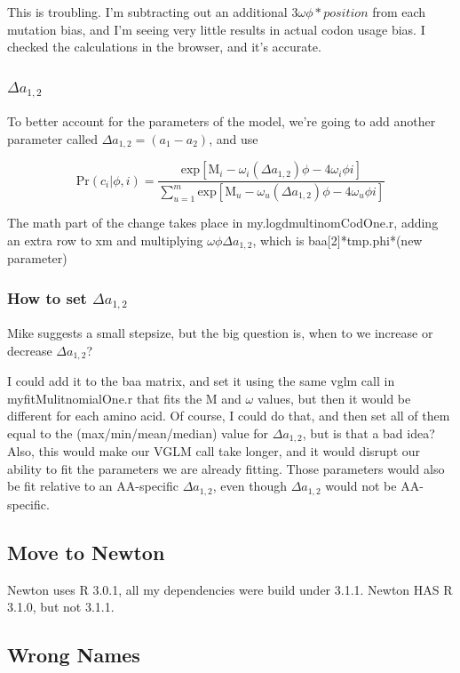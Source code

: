 This is troubling. I'm subtracting out an additional $3\omega\phi * position$ from each mutation bias, and I'm seeing very little results in actual codon usage bias. I checked the calculations in the browser, and it's accurate. 

\subsubsection{$\Delta a_{1,2}$}

To better account for the parameters of the model, we're going to add another parameter called $\Delta a_{1,2} = (a_1 - a_2)$, and use

\[
\mbox{Pr}(c_i|\phi,i)
=
\frac{
\mbox{exp}[\mbox{M}_i
- \omega_i(\Delta a_{1,2})\phi
- 4\omega_i\phi i
]
}{
\sum_{u=1}^m
\mbox{exp}[\mbox{M}_u
- \omega_u(\Delta a_{1,2})\phi
- 4\omega_u\phi i
]
}
\]

The math part of the change takes place in my.logdmultinomCodOne.r, adding an extra row to xm and multiplying $\omega\phi\Delta a_{1,2}$, which is baa[2]*tmp.phi*(new parameter)

\subsubsection{How to set $\Delta a_{1,2}$}

Mike suggests a small stepsize, but the big question is, when to we increase or decrease $\Delta a_{1,2}$?

I could add it to the baa matrix, and set it using the same vglm call in myfitMulitnomialOne.r that fits the M and $\omega$ values, but then it would be different for each amino acid. Of course, I could do that, and then set all of them equal to the (max/min/mean/median) value for $\Delta a_{1,2}$, but is that a bad idea? Also, this would make our VGLM call take longer, and it would disrupt our ability to fit the parameters we are already fitting. Those parameters would also be fit relative to an AA-specific $\Delta a_{1,2}$, even though $\Delta a_{1,2}$ would not be AA-specific.

\subsection{Move to Newton}

Newton uses R 3.0.1, all my dependencies were build under 3.1.1. Newton HAS R 3.1.0, but not 3.1.1.


\subsection{Wrong Names}


